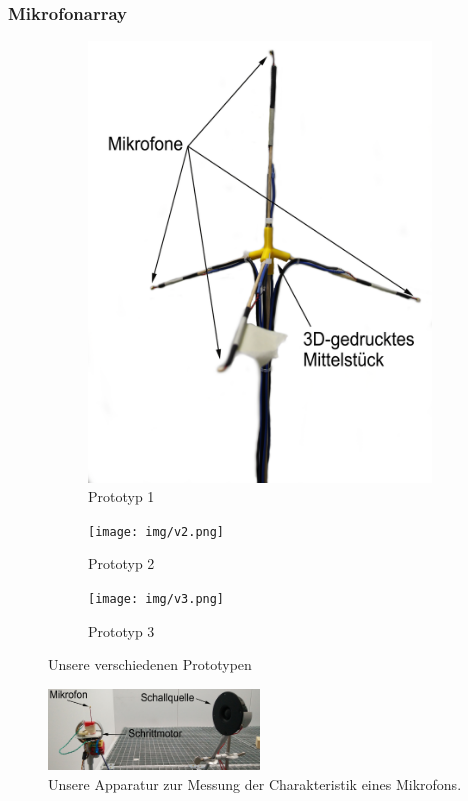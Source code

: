 \subsubsection{Mikrofonarray}
\begin{figure}[H]
    \centering
    \begin{subfigure}[b]{0.3\textwidth}
        \includegraphics[width=\textwidth]{img/v1.png}
        \caption{Prototyp 1\label{fig:prototyp1}}
    \end{subfigure}
    \hfill
    \begin{subfigure}[b]{0.3\textwidth}
        \texttt{[image: img/v2.png]}
        \caption{Prototyp 2\label{fig:prototyp2}}
    \end{subfigure}
    \hfill
    \begin{subfigure}[b]{0.3\textwidth}
        \texttt{[image: img/v3.png]}
        \caption{Prototyp 3\label{fig:prototyp3}}
    \end{subfigure}
    \caption{Unsere verschiedenen Prototypen\label{tet}}
\end{figure}
\begin{figure}
    \centering
    \includegraphics[width=0.5\textwidth]{img/chara_mess}
    \caption{Unsere Apparatur zur Messung der Charakteristik eines Mikrofons.}
\end{figure}
